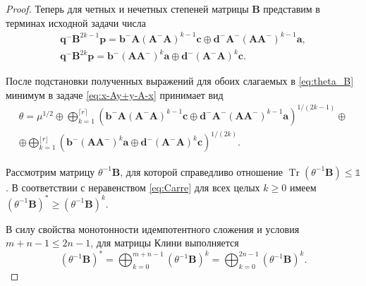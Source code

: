 \documentclass[specialist,
               substylefile = spbu.rtx,
               subf,href,colorlinks=true, 12pt]{disser}
\DeclareMathOperator{\Tr}{Tr}
\theoremstyle{definition}
\begin{document}
\begin{proof}
Теперь для четных и нечетных степеней матрицы $\bm{B}$ представим в терминах исходной задачи числа
\begin{gather*}
\bm{q}^{-}\bm{B}^{2k-1}\bm{p}
=
\bm{b}^{-}\bm{A}(\bm{A}^{-}\bm{A})^{k-1}\bm{c}
\oplus
\bm{d}^{-}\bm{A}^{-}(\bm{A}\bm{A}^{-})^{k-1}\bm{a},
\\
\bm{q}^{-}\bm{B}^{2k}\bm{p}
=
\bm{b}^{-}(\bm{A}\bm{A}^{-})^{k}\bm{a}
\oplus
\bm{d}^{-}(\bm{A}^{-}\bm{A})^{k}\bm{c}.
\end{gather*}

После подстановки полученных выражений для обоих слагаемых в \eqref{eq:theta_B} минимум в задаче \eqref{eq:x-Ay+y-A-x} принимает вид
\begin{multline*}
\theta
=
\mu^{1/2}
\oplus
\bigoplus_{k=1}^{\lceil r\rceil}
\left(
\bm{b}^{-}\bm{A}(\bm{A}^{-}\bm{A})^{k-1}\bm{c}
\oplus
\bm{d}^{-}\bm{A}^{-}(\bm{A}\bm{A}^{-})^{k-1}\bm{a}
\right)^{1/(2k-1)}
\oplus
\\
\oplus
\bigoplus_{k=1}^{\lfloor r\rfloor}
\left(
\bm{b}^{-}(\bm{A}\bm{A}^{-})^{k}\bm{a}
\oplus
\bm{d}^{-}(\bm{A}^{-}\bm{A})^{k}\bm{c}
\right)^{1/(2k)}
.
\end{multline*}

Рассмотрим матрицу $\theta^{-1}\bm{B}$, для которой справедливо отношение $\Tr(\theta^{-1}\bm{B})\leq\mathbb{1}$. В соответствии с неравенством \eqref{eq:Carre} для всех целых $k\geq 0$ имеем
$
(\theta^{-1}\bm{B})^{\ast}
\geq
(\theta^{-1}\bm{B})^{k}
$.

В силу свойства монотонности идемпотентного сложения и условия $m+n-1\leq 2n-1$, для матрицы Клини выполняется
\begin{equation*}
(\theta^{-1}\bm{B})^{\ast}
=
\bigoplus_{k=0}^{m+n-1}(\theta^{-1}\bm{B})^{k}
=
\bigoplus_{k=0}^{2n-1}(\theta^{-1}\bm{B})^{k}
.
\end{equation*}


\end{proof}
\end{document}
